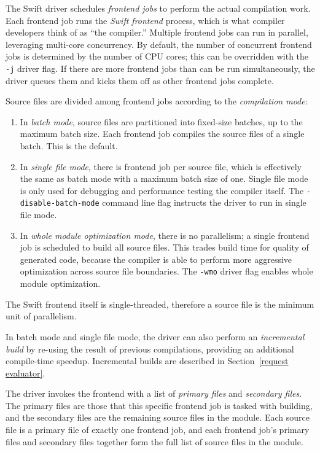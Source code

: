 \documentclass[a4paper,headsepline,bibliography=totoc,toc=flat,fleqn,twoside=semi]{scrbook}
\theoremstyle{definition}
\theoremstyle{definition}
\theoremstyle{definition}
\begin{document}
The Swift driver schedules \emph{frontend jobs} to perform the actual compilation work. Each frontend job runs the \emph{Swift frontend} process, which is what compiler developers think of as ``the compiler.'' Multiple frontend jobs can run in parallel, leveraging multi-core concurrency. By default, the number of concurrent frontend jobs is determined by the number of CPU cores; this can be overridden with the \texttt{-j} driver flag. If there are more frontend jobs than can be run simultaneously, the driver queues them and kicks them off as other frontend jobs complete.

Source files are divided among frontend jobs according to the \emph{compilation mode}:
\begin{enumerate}
\item In \emph{batch mode}, source files are partitioned into fixed-size batches, up to the maximum batch size. Each frontend job compiles the source files of a single batch. This is the default.
\item In \emph{single file mode}, there is frontend job per source file, which is effectively the same as batch mode with a maximum batch size of one. Single file mode is only used for debugging and performance testing the compiler itself. The \texttt{-disable-batch-mode} command line flag instructs the driver to run in single file mode.
\item In \emph{whole module optimization mode}, there is no parallelism; a single frontend job is scheduled to build all source files. This trades build time for quality of generated code, because the compiler is able to perform more aggressive optimization across source file boundaries. The \texttt{-wmo} driver flag enables whole module optimization.
\end{enumerate}
The Swift frontend itself is single-threaded, therefore a source file is the minimum unit of parallelism.

In batch mode and single file mode, the driver can also perform an \emph{incremental build} by re-using the result of previous compilations, providing an additional compile-time speedup. Incremental builds are described in Section~\ref{request evaluator}.

The driver invokes the frontend with a list of \emph{primary files} and \emph{secondary files}. The primary files are those that this specific frontend job is tasked with building, and the secondary files are the remaining source files in the module. Each source file is a primary file of exactly one frontend job, and each frontend job's primary files and secondary files together form the full list of source files in the module.
\end{document}
